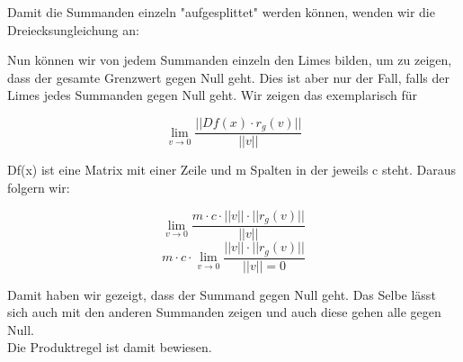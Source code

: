 \documentclass{article}
\begin{document}
\begin{multicols}{2}
Damit die Summanden einzeln "aufgesplittet" werden können, wenden wir die Dreiecksungleichung %
an:

Nun können wir von jedem Summanden einzeln den Limes bilden, um zu zeigen, dass der gesamte Grenzwert gegen Null geht. Dies ist aber nur der Fall, falls der Limes jedes Summanden gegen Null geht. Wir zeigen das exemplarisch für 

\begin{equation} \lim\limits_{v \rightarrow 0} \frac{||Df(x) \cdot r_{g}(v)||}{||v||} \end{equation}

Df(x) ist eine Matrix mit einer Zeile und m Spalten in der jeweils c steht. Daraus folgern wir:

\begin{equation} \lim\limits_{v \rightarrow 0} \frac{m \cdot c \cdot ||v|| \cdot ||r_{g}(v)||}{||v||} \end{equation}
\begin{equation}m \cdot c \cdot \lim\limits_{v \rightarrow 0} \frac{ ||v|| \cdot ||r_{g}(v)||}{||v|| = 0} \end{equation} 

Damit haben wir gezeigt, dass der Summand gegen Null geht. Das Selbe lässt sich auch mit den anderen Summanden zeigen und auch diese gehen alle gegen Null. \\
Die Produktregel ist damit bewiesen.

\end{multicols}
\end{document}
